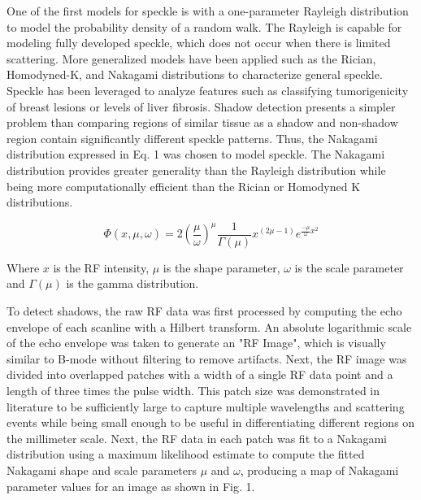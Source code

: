 \documentclass[preprint,5p]{elsarticle}
\begin{document}
One of the first models for speckle is with a one-parameter Rayleigh distribution to model the probability density of a random walk. The Rayleigh is capable for modeling fully developed speckle, which does not occur when there is limited scattering. More generalized models have been applied such as the Rician, Homodyned-K, and Nakagami distributions to characterize general speckle. Speckle has been leveraged to analyze features such as classifying tumorigenicity of breast lesions or levels of liver fibrosis. Shadow detection presents a simpler problem than comparing regions of similar tissue as a shadow and non-shadow region contain significantly different speckle patterns. Thus, the Nakagami distribution expressed in Eq. 1 was chosen to model speckle. The Nakagami distribution provides greater generality than the Rayleigh distribution while being more computationally efficient than the Rician or Homodyned K distributions.

\begin{equation}
\Phi(x,\mu,\omega) = 2(\frac{\mu}{\omega})^{\mu}\frac{1}{\Gamma(\mu)}x^{(2\mu-1)}e^{\frac{-\mu}{\omega}x^{2}}
\end{equation}

Where $x$ is the RF intensity, $\mu$ is the shape parameter, $\omega$ is the scale parameter and $\Gamma(\mu)$ is the gamma distribution.

To detect shadows, the raw RF data was first processed by computing the echo envelope of each scanline with a Hilbert transform. An absolute logarithmic scale of the echo envelope was taken to generate an "RF Image", which is visually similar to B-mode without filtering to remove artifacts. Next, the RF image was divided into overlapped patches with a width of a single RF data point and a length of three times the pulse width. This patch size was demonstrated in literature to be sufficiently large to capture multiple wavelengths and scattering events while being small enough to be useful in differentiating different regions on the millimeter scale. Next, the RF data in each patch was fit to a Nakagami distribution using a maximum likelihood estimate to compute the fitted Nakagami shape and scale parameters $\mu$ and $\omega$, producing a map of Nakagami parameter values for an image as shown in Fig. 1.
\end{document}
